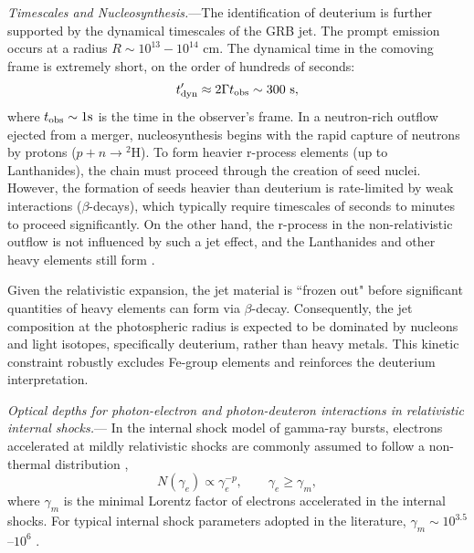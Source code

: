 \documentclass[aps,prl,twocolumn,superscriptaddress,showpacs,preprintnumbers,amsmath,amssymb,linenumbers]{revtex4-2}
\begin{document}
\textit{Timescales and Nucleosynthesis.}---The identification of deuterium is further supported by the dynamical timescales of the GRB jet. The prompt emission occurs at a radius $R \sim 10^{13}-10^{14}$ cm. %
The dynamical time in the comoving frame is extremely short, on the order of hundreds of seconds:
\begin{equation}
t'_{\rm dyn} \approx 2\Gamma t_{\rm obs} \sim 300 \text{ s},
\end{equation}
where $t_{\rm obs} \sim 1 \text{s}$ is the time in the observer's frame.
In a neutron-rich outflow ejected from a merger, nucleosynthesis begins with the rapid capture of neutrons by protons ($p + n \rightarrow {^2\text{H}}$). To form heavier r-process elements (up to Lanthanides), the chain must proceed through the creation of seed nuclei. However, the formation of seeds heavier than deuterium is rate-limited by weak interactions ($\beta$-decays), which typically require timescales of seconds to minutes to proceed significantly. On the other hand, the r-process in the non-relativistic outflow is not influenced by such a jet effect, and the Lanthanides and other heavy elements still form \cite{2017Natur.551...80K}. 

Given the relativistic expansion, the jet material is ``frozen out" before significant quantities of heavy elements can form via $\beta$-decay. Consequently, the jet composition at the photospheric radius is expected to be dominated by nucleons and light isotopes, specifically deuterium, rather than heavy metals. This kinetic constraint robustly excludes Fe-group elements and reinforces the deuterium interpretation.

\textit{Optical depths for photon-electron and photon-deuteron interactions in relativistic internal shocks.}---
In the internal shock model of gamma-ray bursts, electrons accelerated at mildly relativistic shocks are commonly assumed to follow a non-thermal distribution \cite{2004RvMP...76.1143P},
\begin{equation}
N(\gamma_e) \propto \gamma_e^{-p}, \qquad \gamma_e \ge \gamma_m ,
\end{equation}
where $\gamma_m$ is the minimal Lorentz factor of electrons accelerated in the internal shocks. %
For typical internal shock parameters adopted in the literature, $\gamma_m \sim 10^{3.5}$--$10^6$ \cite{2013ApJ...769...69B,2019A&A...628A..59O}.
\end{document}
